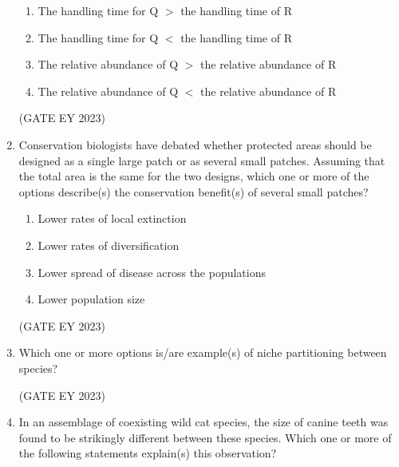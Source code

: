 \documentclass[journal,12pt,onecolumn]{IEEEtran}
\theoremstyle{remark}
\begin{document}
\begin{enumerate}
\begin{enumerate}

\item The handling time for Q $>$ the handling time of R
\item The handling time for Q $<$ the handling time of R
\item The relative abundance of Q $>$ the relative abundance of R
\item The relative abundance of Q $<$ the relative abundance of R


\end{enumerate}

\hfill{(GATE EY 2023)}


 \item Conservation biologists have debated whether protected areas should be designed
as a single large patch or as several small patches. Assuming that the total area is
the same for the two designs, which one or more of the options describe(s) the
conservation benefit(s) of several small patches?
\begin{enumerate}

\item Lower rates of local extinction
\item Lower rates of diversification
\item Lower spread of disease across the populations
\item Lower population size


\end{enumerate}
\hfill{(GATE EY 2023)}


 \item Which one or more options is/are example(s) of niche partitioning between
species?

\begin{enumerate}
\end{enumerate}

\hfill{(GATE EY 2023)}



 \item
  In an assemblage of coexisting wild cat species, the size of canine teeth was found
to be strikingly different between these species. Which one or more of the
following statements explain(s) this observation? 
\begin{enumerate}


\end{enumerate}
\end{enumerate}
\end{document}
